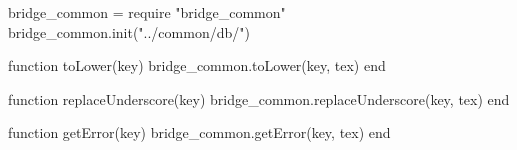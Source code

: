 \begin{luacode}

  bridge_common = require "bridge_common"
  bridge_common.init("../common/db/")

  function toLower(key)
    bridge_common.toLower(key, tex)
  end

  function replaceUnderscore(key)
    bridge_common.replaceUnderscore(key, tex)
  end

  function getError(key)
    bridge_common.getError(key, tex)
  end

\end{luacode}
